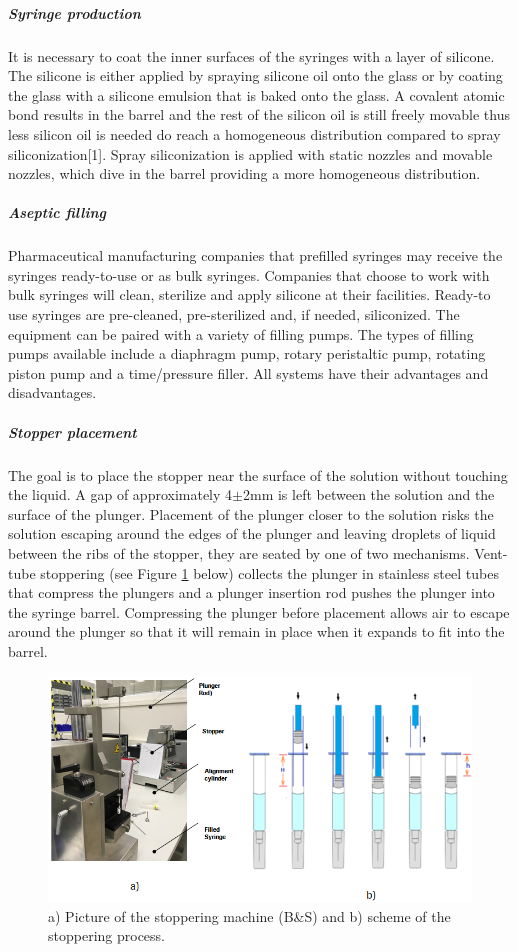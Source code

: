 \subparagraph{Syringe production}
It is necessary to coat the inner surfaces of the syringes with a layer of silicone. The silicone is either applied by spraying
silicone oil onto the glass or by coating the glass with a silicone emulsion that is baked onto the glass. A covalent atomic bond results in the barrel and the rest of the silicon oil is still freely movable thus less silicon oil is needed do reach a homogeneous distribution compared to spray siliconization[1]. Spray siliconization is applied with static nozzles and movable nozzles, which dive in the barrel providing a more homogeneous distribution. 
\subparagraph{Aseptic filling}
Pharmaceutical manufacturing companies that prefilled syringes may receive the syringes ready-to-use or as bulk syringes. Companies that choose to work with bulk syringes will clean, sterilize and apply silicone at their facilities. Ready-to use syringes are pre-cleaned, pre-sterilized and, if needed, siliconized.
The equipment can be paired with a variety of filling pumps. The types of filling pumps available include a diaphragm pump, rotary peristaltic pump, rotating piston pump and a time/pressure filler. All systems have their advantages and disadvantages.
\subparagraph{Stopper placement}
The goal is to place the stopper near the surface of the solution without touching the liquid. A gap of approximately 4$\pm$2mm is left between the solution and the surface of the plunger. Placement of the plunger closer to the solution risks the solution escaping around the edges of the plunger and leaving droplets of liquid between the ribs of the stopper, they are seated by one of two mechanisms. Vent-tube stoppering (see Figure \ref{fgr:stoppering} below) collects the plunger in stainless steel tubes that compress the plungers and a plunger insertion rod pushes the plunger into the syringe barrel. Compressing the plunger before placement allows air to escape around the plunger so that it will remain in place when it expands to fit into the barrel. 

\begin{figure}[h]	
	\centering
\includegraphics[height=6cm]{img/stoppering.PNG}
   \caption{a) Picture of the stoppering machine (B\&S) and b) scheme of the stoppering process.}
 \label{fgr:stoppering}
\end{figure}

